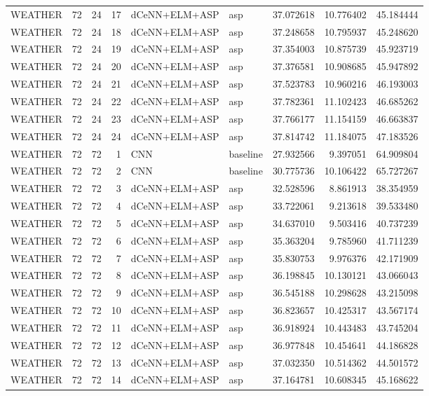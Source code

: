 \begin{table}
\begin{tabular}{lrrrllrrr}
WEATHER & 72 & 24 & 17 & dCeNN+ELM+ASP & asp & 37.072618 & 10.776402 & 45.184444 \\
WEATHER & 72 & 24 & 18 & dCeNN+ELM+ASP & asp & 37.248658 & 10.795937 & 45.248620 \\
WEATHER & 72 & 24 & 19 & dCeNN+ELM+ASP & asp & 37.354003 & 10.875739 & 45.923719 \\
WEATHER & 72 & 24 & 20 & dCeNN+ELM+ASP & asp & 37.376581 & 10.908685 & 45.947892 \\
WEATHER & 72 & 24 & 21 & dCeNN+ELM+ASP & asp & 37.523783 & 10.960216 & 46.193003 \\
WEATHER & 72 & 24 & 22 & dCeNN+ELM+ASP & asp & 37.782361 & 11.102423 & 46.685262 \\
WEATHER & 72 & 24 & 23 & dCeNN+ELM+ASP & asp & 37.766177 & 11.154159 & 46.663837 \\
WEATHER & 72 & 24 & 24 & dCeNN+ELM+ASP & asp & 37.814742 & 11.184075 & 47.183526 \\
WEATHER & 72 & 72 & 1 & CNN & baseline & 27.932566 & 9.397051 & 64.909804 \\
WEATHER & 72 & 72 & 2 & CNN & baseline & 30.775736 & 10.106422 & 65.727267 \\
WEATHER & 72 & 72 & 3 & dCeNN+ELM+ASP & asp & 32.528596 & 8.861913 & 38.354959 \\
WEATHER & 72 & 72 & 4 & dCeNN+ELM+ASP & asp & 33.722061 & 9.213618 & 39.533480 \\
WEATHER & 72 & 72 & 5 & dCeNN+ELM+ASP & asp & 34.637010 & 9.503416 & 40.737239 \\
WEATHER & 72 & 72 & 6 & dCeNN+ELM+ASP & asp & 35.363204 & 9.785960 & 41.711239 \\
WEATHER & 72 & 72 & 7 & dCeNN+ELM+ASP & asp & 35.830753 & 9.976376 & 42.171909 \\
WEATHER & 72 & 72 & 8 & dCeNN+ELM+ASP & asp & 36.198845 & 10.130121 & 43.066043 \\
WEATHER & 72 & 72 & 9 & dCeNN+ELM+ASP & asp & 36.545188 & 10.298628 & 43.215098 \\
WEATHER & 72 & 72 & 10 & dCeNN+ELM+ASP & asp & 36.823657 & 10.425317 & 43.567174 \\
WEATHER & 72 & 72 & 11 & dCeNN+ELM+ASP & asp & 36.918924 & 10.443483 & 43.745204 \\
WEATHER & 72 & 72 & 12 & dCeNN+ELM+ASP & asp & 36.977848 & 10.454641 & 44.186828 \\
WEATHER & 72 & 72 & 13 & dCeNN+ELM+ASP & asp & 37.032350 & 10.514362 & 44.501572 \\
WEATHER & 72 & 72 & 14 & dCeNN+ELM+ASP & asp & 37.164781 & 10.608345 & 45.168622 \\

\end{tabular}
\end{table}

